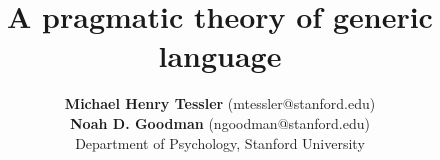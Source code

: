 \documentclass[10pt,letterpaper]{article}
\title{A pragmatic theory of generic language}
\author{{\large \bf Michael Henry Tessler} (mtessler@stanford.edu)\\ {\large \bf Noah D. Goodman} (ngoodman@stanford.edu) \\
  Department of Psychology, Stanford University}
\newcommand{\ndg}[1]{\textcolor{Green}{[ndg: #1]}}
\newcommand{\mht}[1]{\textcolor{Blue}{[mht: #1]}}
\begin{document}
\maketitle


\begin{abstract}

%

\end{abstract}
\end{document}
